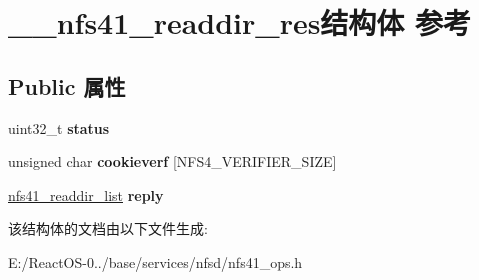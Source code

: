 \hypertarget{struct____nfs41__readdir__res}{}\section{\+\_\+\+\_\+nfs41\+\_\+readdir\+\_\+res结构体 参考}
\label{struct____nfs41__readdir__res}
\subsection*{Public 属性}
\begin{DoxyCompactItemize}
\item 
\mbox{\label{struct____nfs41__readdir__res_aa17a04ac4cc7c4857355c5da46bacaec}} 
uint32\+\_\+t {\bfseries status}
\item 
\mbox{\label{struct____nfs41__readdir__res_a64ca914df231c7c22b234265ee4240d6}} 
unsigned char {\bfseries cookieverf} \mbox{[}N\+F\+S4\+\_\+\+V\+E\+R\+I\+F\+I\+E\+R\+\_\+\+S\+I\+ZE\mbox{]}
\item 
\mbox{\label{struct____nfs41__readdir__res_a447e9a8b204cd7c0f7ad16e241f1b48c}} 
\hyperlink{struct____nfs41__readdir__list}{nfs41\+\_\+readdir\+\_\+list} {\bfseries reply}
\end{DoxyCompactItemize}


该结构体的文档由以下文件生成\+:\begin{DoxyCompactItemize}
\item 
E\+:/\+React\+O\+S-\/0../base/services/nfsd/nfs41\+\_\+ops.\+h\end{DoxyCompactItemize}
